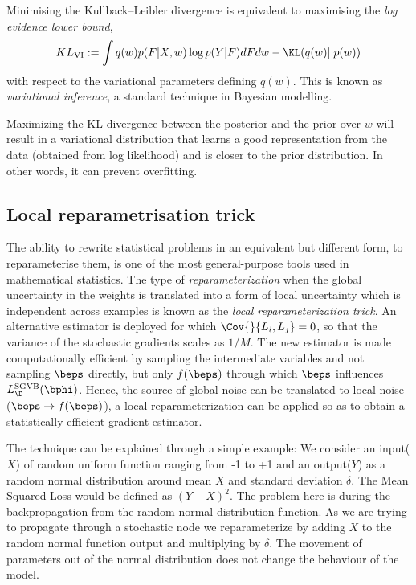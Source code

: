 Minimising the Kullback--Leibler divergence is equivalent to maximising the \textit{log evidence lower bound},
\begin{align}
KL_{\text{VI}} := \int q(w) p(F | X, w) \log p(Y | F) dF dw - \KL(q(w) || p(w)) \label{eq:L:VI}
\end{align}
with respect to the variational parameters defining $q(w)$. This is known as \textit{variational inference}, a standard technique in Bayesian modelling.

Maximizing the KL divergence between the posterior and the prior over $w$ will result in a variational distribution that learns a good representation from the data (obtained from log likelihood) and is closer to the prior distribution. In other words, it can prevent overfitting. 


\subsection{Local  reparametrisation  trick}
The ability to rewrite statistical problems in an equivalent but different form, to reparameterise them, is one of the most general-purpose tools used in mathematical statistics. The type of \textit{reparameterization} when the global uncertainty in the weights is translated into a form of local uncertainty which is independent across examples is known as the \emph{local reparameterization trick}. 
An alternative estimator is deployed for which $\Cov{}{L_{i},L_{j}} = 0$, so that the variance of the stochastic gradients scales as $1/M$.
The new estimator is made computationally efficient by sampling the intermediate variables and not sampling $\beps$ directly, but only  $f(\beps)$ through which $\beps$ influences $L_\D^\text{SGVB}(\bphi)$. Hence, the source of global noise can be translated to local noise ($\beps \rightarrow f(\beps)$), a local reparameterization can be applied so as to obtain a statistically efficient gradient estimator.

The technique can be explained through a simple example: We consider an input($X$) of random uniform function ranging from -1 to +1 and an output($Y$) as a random normal distribution around mean $X$ and standard deviation $\delta$. The Mean Squared Loss would be defined as 
$(Y-X)^2$. The problem here is during the backpropagation from the random normal distribution function. As we are trying to propagate through a stochastic node we reparameterize by adding $X$ to the random normal function output and multiplying by $\delta$.
The movement of parameters out of the normal distribution does not change the behaviour of the model. 



